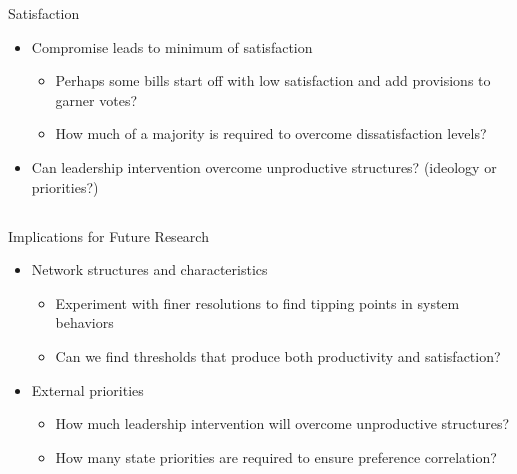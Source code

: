 \documentclass[14pt]{beamer}
\begin{document}
\begin{frame}{Satisfaction}
\begin{itemize}
\item Compromise leads to minimum of satisfaction
 \begin{itemize}
 \item Perhaps some bills start off with low satisfaction and add provisions to garner votes?
 \item How much of a majority is required to overcome dissatisfaction levels?
 \end{itemize}
\item Can leadership intervention overcome unproductive structures? (ideology or priorities?) 
\end{itemize}
\end{frame}

\subsection*{} %
\begin{frame}{Implications for Future Research}
\begin{itemize}
\item Network structures and characteristics
 \begin{itemize}
 \item Experiment with finer resolutions to find tipping points in system behaviors
 \item Can we find thresholds that produce both productivity and satisfaction?
 \end{itemize}
\item External priorities
  \begin{itemize}
  \item How much leadership intervention will overcome unproductive structures?
  \item How many state priorities are required to ensure preference correlation?
  \end{itemize}
\end{itemize}
\end{frame}
\end{document}
